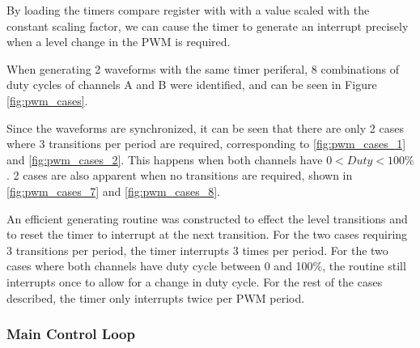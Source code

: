 By loading the timers compare register with with a value scaled with the constant scaling factor, we can cause the timer to generate an interrupt precisely when a level change in the PWM is required.

When generating 2 waveforms with the same timer periferal, 8 combinations of duty cycles of channels A and B were identified, and can be seen in Figure \ref{fig:pwm_cases}.

Since the waveforms are synchronized, it can be seen that there are only 2 cases where 3 transitions per period are required, corresponding to \ref{fig:pwm_cases_1} and \ref{fig:pwm_cases_2}. This happens when both channels have $0<Duty<100\%$. 2 cases are also apparent when no transitions are required, shown in \ref{fig:pwm_cases_7} and \ref{fig:pwm_cases_8}.

An efficient generating routine was constructed to effect the level transitions and to reset the timer to interrupt at the next transition. For the two cases requiring 3 transitions per period, the timer interrupts 3 times per period. For the two cases where both channels have duty cycle between 0 and 100\%, the routine still interrupts once to allow for a change in duty cycle. For the rest of the cases described, the timer only interrupts twice per PWM period.



\subsubsection{Main Control Loop}